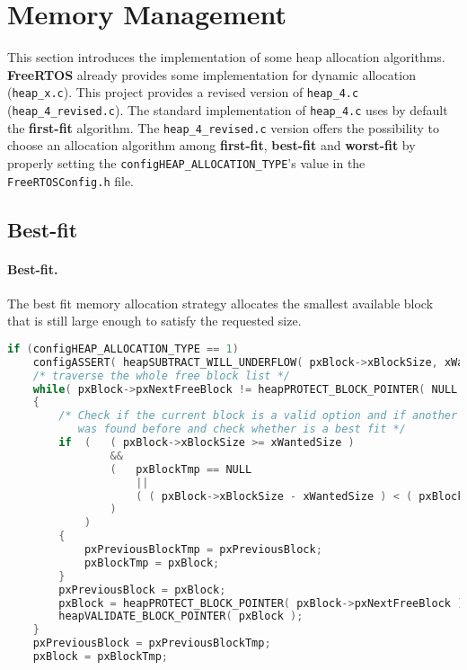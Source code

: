 \section{Memory Management}
\label{sec: Memory Management}
This section introduces the implementation of some heap allocation algorithms. \textbf{FreeRTOS} already provides some implementation for dynamic allocation (\texttt{heap\_x.c}).
This project provides a revised version of \texttt{heap\_4.c} (\texttt{heap\_4\_revised.c}). The standard implementation of \texttt{heap\_4.c} uses by default the \textbf{first-fit} algorithm. The \texttt{heap\_4\_revised.c} version offers the possibility to choose an allocation algorithm among \textbf{first-fit}, \textbf{best-fit} and \textbf{worst-fit} by properly setting the \texttt{configHEAP\_ALLOCATION\_TYPE}'s value in the \texttt{FreeRTOSConfig.h} file.

\subsection{Best-fit}
\label{subsec: Best-Fit}
\paragraph{Best-fit.} The best fit memory allocation strategy allocates the smallest available block that is still large enough to satisfy the requested size.
\begin{lstlisting}[language=C,caption={Custom implementation of Best-Fit algorithm added to heap\_4.c}]
if (configHEAP_ALLOCATION_TYPE == 1)
    configASSERT( heapSUBTRACT_WILL_UNDERFLOW( pxBlock->xBlockSize, xWantedSize ) == 0 );
    /* traverse the whole free block list */
    while( pxBlock->pxNextFreeBlock != heapPROTECT_BLOCK_POINTER( NULL ) )
    {
        /* Check if the current block is a valid option and if another valid block
           was found before and check whether is a best fit */
        if  (   ( pxBlock->xBlockSize >= xWantedSize )
                &&
                (   pxBlockTmp == NULL
                    ||
                    ( ( pxBlock->xBlockSize - xWantedSize ) < ( pxBlockTmp->xBlockSize - xWantedSize ) )
                )
            )
        {
            pxPreviousBlockTmp = pxPreviousBlock;
            pxBlockTmp = pxBlock;
        }
        pxPreviousBlock = pxBlock;
        pxBlock = heapPROTECT_BLOCK_POINTER( pxBlock->pxNextFreeBlock );
        heapVALIDATE_BLOCK_POINTER( pxBlock );
    }
    pxPreviousBlock = pxPreviousBlockTmp;
    pxBlock = pxBlockTmp;
\end{lstlisting}

